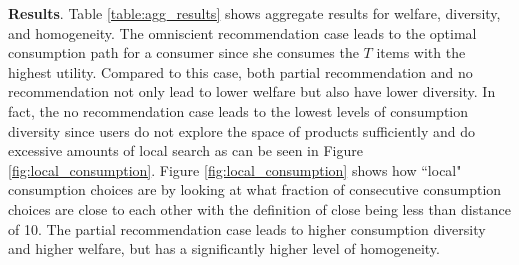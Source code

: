 \documentclass[sigconf]{acmart}
\begin{document}
\small
\noindent \textbf{Results}. Table \ref{table:agg_results} shows aggregate results for welfare, diversity, and homogeneity. The omniscient recommendation case leads to the optimal consumption path for a consumer since she consumes the $T$ items with the highest utility. Compared to this case, both partial recommendation and no recommendation not only lead to lower welfare but also have lower diversity. In fact, the no recommendation case leads to the lowest levels of consumption diversity since users do not explore the space of products sufficiently and do excessive amounts of local search as can be seen in Figure \ref{fig:local_consumption}. Figure \ref{fig:local_consumption} shows how ``local" consumption choices are by looking at what fraction of consecutive consumption choices are close to each other with the definition of close being less than distance of 10.  The partial recommendation case leads to higher consumption diversity and higher welfare, but has a significantly higher level of homogeneity.
\end{document}
